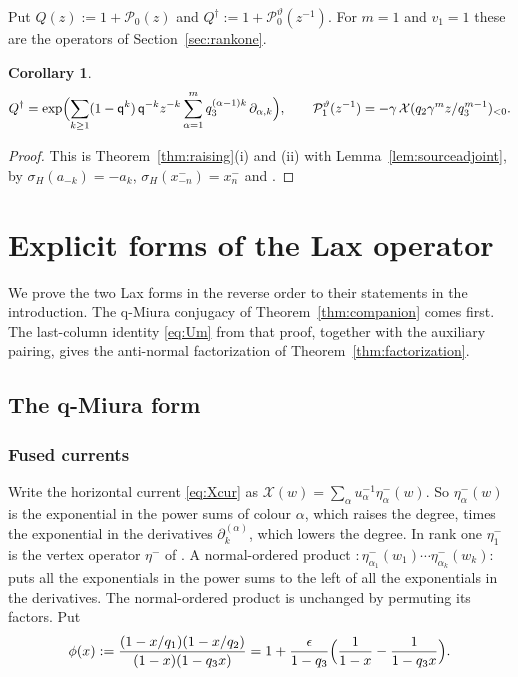 \documentclass[11pt]{amsart}
\newtheorem{corollary}[theorem]{Corollary}
\theoremstyle{definition}
\theoremstyle{remark}
\newcommand{\Mq}{\mathsf q}                      %
\newcommand{\sigH}{\sigma_H}                     %
\newcommand{\Pser}[1]{\mathcal P_{#1}}           %
\newcommand{\Xcur}{\mathcal X}                   %
\newcommand{\Qcr}{Q}                             %
\newcommand{\Qan}{Q^\dagger}                     %
\begin{document}
Put \(\Qcr(z):=1+\Pser{0}(z)\) and \(\Qan:=1+\Pser{0}^\vartheta(z^{-1})\). For \(m=1\) and \(v_1=1\) these are
the operators of Section~\ref{sec:rankone}.

\begin{corollary}\label{cor:Qdagger}
\[
 \Qan=\exp\Bigl(\sum_{k\geq1}(1-\Mq^k)\,\Mq^{-k}z^{-k}\sum_{\alpha=1}^mq_3^{(\alpha-1)k}\,\partial_{\alpha,k}\Bigr),
 \qquad
 \Pser{1}^\vartheta(z^{-1})=-\gamma\,\Xcur(q_2\gamma^mz/q_3^{m-1})_{<0}.
\]
\end{corollary}

\begin{proof}
This is Theorem~\ref{thm:raising}(i) and (ii) with Lemma~\ref{lem:sourceadjoint}, by
\(\sigH(a_{-k})=-a_k\), \(\sigH(x^-_{-n})=x^-_n\) \cite[(2.21)]{BCS} and \cite[(2.50)]{BCS}.
\end{proof}

\section{Explicit forms of the Lax operator}\label{sec:laxforms}

We prove the two Lax forms in the reverse order to their statements in the introduction.
The q-Miura conjugacy of Theorem~\ref{thm:companion} comes first.
The last-column identity \eqref{eq:Um} from that proof, together with the
auxiliary pairing, gives the anti-normal factorization
of Theorem~\ref{thm:factorization}.

\subsection{The q-Miura form}\label{sec:qmiuraform}

\subsubsection{Fused currents}\label{sec:qmiura}

Write the horizontal current \eqref{eq:Xcur} as \(\Xcur(w)=\sum_\alpha u_\alpha^{-1}\eta^-_\alpha(w)\).
So \(\eta^-_\alpha(w)\) is the exponential in the power sums of colour \(\alpha\), which raises the
degree, times the exponential in the derivatives \(\partial^{(\alpha)}_k\), which lowers the degree. In rank
one \(\eta^-_1\) is the vertex operator \(\eta^-\) of \cite[(2.34)]{BCS}. A normal-ordered product
\({:}\eta^-_{\alpha_1}(w_1)\cdots\eta^-_{\alpha_k}(w_k){:}\) puts all the exponentials in the power sums
to the left of all the exponentials in the derivatives.
The normal-ordered product is unchanged by permuting its factors. Put
\[
 \phi(x):=\frac{(1-x/q_1)(1-x/q_2)}{(1-x)(1-q_3x)}
 =1+\frac{\epsilon}{1-q_3}\Bigl(\frac{1}{1-x}-\frac{1}{1-q_3x}\Bigr).
\]
\end{document}
